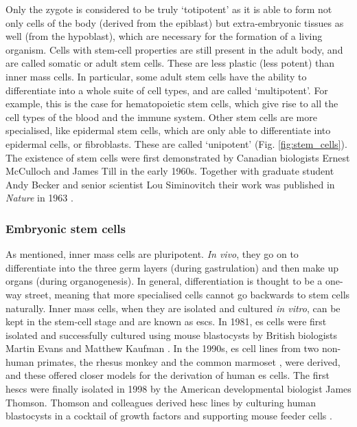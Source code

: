 Only the zygote is considered to be truly `totipotent' as it is able to form not only cells of the body (derived from the epiblast) but extra-embryonic tissues as well (from the hypoblast), which are necessary for the formation of a living organism.
Cells with stem-cell properties are still present in the adult body, and are called somatic or adult stem cells.
These are less plastic (less potent) than inner mass cells.
In particular, some adult stem cells have the ability to differentiate into a whole suite of cell types, and are called `multipotent'.
For example, this is the case for hematopoietic stem cells, which give rise to all the cell types of the blood and the immune system.
Other stem cells are more specialised, like epidermal stem cells, which are only able to differentiate into epidermal cells, or fibroblasts.
These are called `unipotent' (Fig. \ref{fig:stem_cells}).\\

The existence of stem cells were first demonstrated by Canadian biologists Ernest McCulloch and James Till in the early 1960s.
Together with graduate student Andy Becker and senior scientist Lou Siminovitch their work was published in \textit{Nature} in 1963 \cite{becker1963cytological}.

\subsubsection{Embryonic stem cells}

As mentioned, inner mass cells are pluripotent.
\textit{In vivo}, they go on to differentiate into the three germ layers (during gastrulation) and then make up organs (during organogenesis).
In general, differentiation is thought to be a one-way street, meaning that more specialised cells cannot go backwards to stem cells naturally.
Inner mass cells, when they are isolated and cultured \textit{in vitro}, can be kept in the stem-cell stage and are known as \glspl{esc}.
In 1981, \gls{es} cells were first isolated and successfully cultured using mouse blastocysts by British biologists Martin Evans and Matthew Kaufman \cite{evans1981establishment, martin1981isolation}.
In the 1990s, \gls{es} cell lines from two non-human primates, the rhesus monkey \cite{thomson1995isolation} and the common marmoset \cite{thomson1996pluripotent}, were derived, and these offered closer models for the derivation of human \gls{es} cells. 
The first \glspl{hesc} were finally isolated in 1998 by the American developmental biologist James Thomson.
Thomson and colleagues derived \gls{hesc} lines by culturing human blastocysts in a cocktail of growth factors and supporting mouse feeder cells \cite{thomson1998embryonic}. \\

